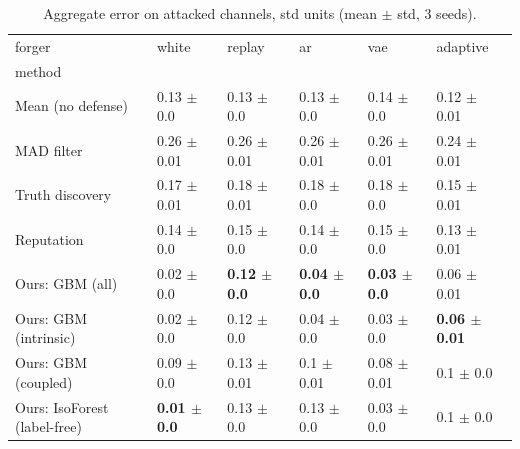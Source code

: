 \begin{table}
\caption{Aggregate error on attacked channels, std units (mean $\pm$ std, 3 seeds).}
\label{tab:err}
\begin{tabular}{llllll}
\toprule
forger & white & replay & ar & vae & adaptive \\
method &  &  &  &  &  \\
\midrule
Mean (no defense) & 0.13 $\pm$ 0.0 & 0.13 $\pm$ 0.0 & 0.13 $\pm$ 0.0 & 0.14 $\pm$ 0.0 & 0.12 $\pm$ 0.01 \\
MAD filter & 0.26 $\pm$ 0.01 & 0.26 $\pm$ 0.01 & 0.26 $\pm$ 0.01 & 0.26 $\pm$ 0.01 & 0.24 $\pm$ 0.01 \\
Truth discovery & 0.17 $\pm$ 0.01 & 0.18 $\pm$ 0.01 & 0.18 $\pm$ 0.0 & 0.18 $\pm$ 0.0 & 0.15 $\pm$ 0.01 \\
Reputation & 0.14 $\pm$ 0.0 & 0.15 $\pm$ 0.0 & 0.14 $\pm$ 0.0 & 0.15 $\pm$ 0.0 & 0.13 $\pm$ 0.01 \\
Ours: GBM (all) & 0.02 $\pm$ 0.0 & \textbf{0.12 $\pm$ 0.0} & \textbf{0.04 $\pm$ 0.0} & \textbf{0.03 $\pm$ 0.0} & 0.06 $\pm$ 0.01 \\
Ours: GBM (intrinsic) & 0.02 $\pm$ 0.0 & 0.12 $\pm$ 0.0 & 0.04 $\pm$ 0.0 & 0.03 $\pm$ 0.0 & \textbf{0.06 $\pm$ 0.01} \\
Ours: GBM (coupled) & 0.09 $\pm$ 0.0 & 0.13 $\pm$ 0.01 & 0.1 $\pm$ 0.01 & 0.08 $\pm$ 0.01 & 0.1 $\pm$ 0.0 \\
Ours: IsoForest (label-free) & \textbf{0.01 $\pm$ 0.0} & 0.13 $\pm$ 0.0 & 0.13 $\pm$ 0.0 & 0.03 $\pm$ 0.0 & 0.1 $\pm$ 0.0 \\
\bottomrule
\end{tabular}
\end{table}
